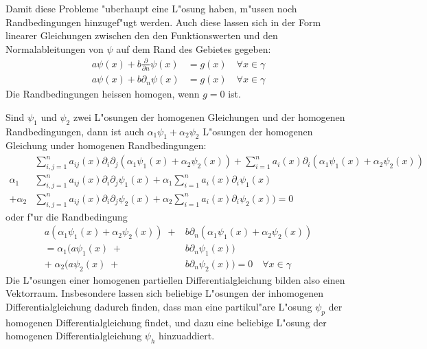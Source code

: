 Damit diese Probleme "uberhaupt eine L"osung haben, m"ussen noch 
Randbedingungen hinzugef"ugt werden.
Auch diese lassen sich in der Form linearer Gleichungen zwischen den 
den Funktionswerten und den Normalableitungen von $\psi$ auf dem Rand des
Gebietes gegeben:
\begin{align*}
a\psi(x)+
b\frac{\partial}{\partial n}\psi(x)
&=g(x)\quad\forall x\in\gamma\\
a\psi(x)+b\partial_n\psi(x)&=g(x)\quad\forall x\in\gamma
\end{align*}
Die Randbedingungen heissen homogen, wenn $g=0$ ist.

Sind $\psi_1$ und $\psi_2$ zwei L"osungen der homogenen Gleichungen und der
homogenen Randbedingungen, dann ist auch $\alpha_1\psi_1+\alpha_2\psi_2$
L"osungen der homogenen Gleichung under homogenen Randbedingungen:
\begin{align*}
&\sum_{i,j=1}^n a_{ij}(x)\partial_i \partial_j
(\alpha_1\psi_1(x)+\alpha_2\psi_2(x))
+\sum_{i=1}^na_i(x)\partial_i
(\alpha_1\psi_1(x)+\alpha_2\psi_2(x))
\\
\alpha_1
&\sum_{i,j=1}^n a_{ij}(x)\partial_i \partial_j
\psi_1(x)
+
\alpha_1
\sum_{i=1}^na_i(x)\partial_i
\psi_1(x)
\\
+
\alpha_2
&\sum_{i,j=1}^n a_{ij}(x)\partial_i \partial_j
\psi_2(x)
+
\alpha_2
\sum_{i=1}^na_i(x)\partial_i
\psi_2(x))
=0
\end{align*}
oder f"ur die Randbedingung
\begin{align*}
a(\alpha_1\psi_1(x) +\alpha_2\psi_2(x))
\;+&b\partial_n
(\alpha_1\psi_1(x) +\alpha_2\psi_2(x))\\
=\alpha_1(a\psi_1(x)
\;+&b\partial_n
\psi_1(x))\\
+\;\alpha_2(a\psi_2(x)
\;+&b\partial_n
\psi_2(x))
=0\quad\forall x\in\gamma
\end{align*}
Die L"osungen einer homogenen partiellen Differentialgleichung
bilden also einen Vektorraum. Insbesondere lassen sich beliebige
L"osungen der inhomogenen Differentialgleichung dadurch finden, dass
man eine partikul"are L"osung $\psi_p$ der homogenen Differentialgleichung
findet, und dazu eine beliebige L"osung der homogenen Differentialgleichung
$\psi_h$ hinzuaddiert.

